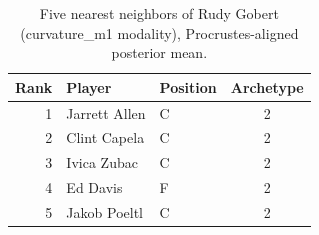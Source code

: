 \begin{table}[htbp]
  \centering\small
  \begin{tabular}{rllc}
    \toprule
    Rank & Player & Position & Archetype \\
    \midrule
    1 & Jarrett Allen & C & 2 \\
    2 & Clint Capela & C & 2 \\
    3 & Ivica Zubac & C & 2 \\
    4 & Ed Davis & F & 2 \\
    5 & Jakob Poeltl & C & 2 \\
    \bottomrule
  \end{tabular}
  \caption{Five nearest neighbors of Rudy Gobert (curvature_m1 modality), Procrustes-aligned posterior mean.}
  \label{tab:Rudy_Gobert_neighbors_curvature_m1}
\end{table}

